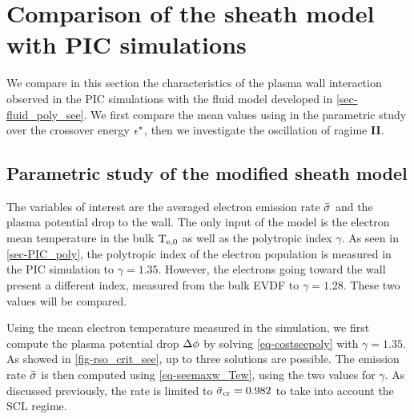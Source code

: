 

\section{Comparison of the sheath model with PIC simulations} \label{subsec-picandmodel}


  We compare in this section the characteristics of the plasma wall interaction observed in the \ac{PIC} simulations with the fluid model developed in \cref{sec-fluid_poly_see}.
  We first compare the mean values using in the parametric study over the crossover energy $\epsilon^{*}$, then we investigate the oscillation of ragime {\bf II}.

  \subsection{Parametric study of the modified sheath model} \label{subsec-param_sheath_see}

    The variables of interest are the averaged electron emission rate $ \bar{\sigma }$ and the plasma potential drop to the wall.
    The only input of the model is the electron mean temperature in the bulk $\mathrm{T_{e, 0}}$ as well as the polytropic index $\gamma$.
    As seen in \cref{sec-PIC_poly}, the polytropic index of the electron population is measured in the \ac{PIC} simulation to $\gamma=1.35$.
    However, the electrons going toward the wall present a different index, measured from the bulk \ac{EVDF} to $\gamma=1.28$.
    These two values will be compared.

    Using the mean electron temperature measured in the simulation, we first compute the plasma potential drop $\Delta \phi$ by solving \cref{eq-costseepoly} with $\gamma=1.35$.
    As showed in \cref{fig-rso_crit_see}, up to three solutions are possible.
    The emission rate $ \bar{\sigma }$ is then computed using \cref{eq-seemaxw_Tew}, using the two values for $\gamma$.
    As discussed previously, the rate is limited to $ \bar{\sigma }_{\rm cr}=0.982$ to take into account the \ac{SCL} regime.

